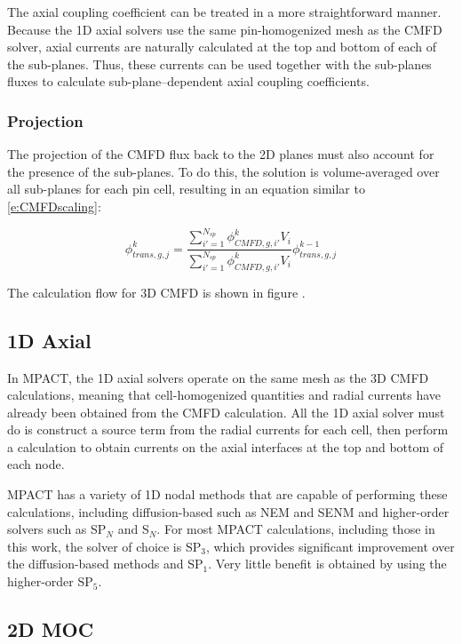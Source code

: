 The axial coupling coefficient can be treated in a more straightforward manner.  Because the 1D axial solvers use the same pin-homogenized mesh as the CMFD solver, axial currents are naturally calculated at the top and bottom of each of the sub-planes.  Thus, these currents can be used together with the sub-planes fluxes to calculate sub-plane--dependent axial coupling coefficients.

\subsubsection{Projection}

The projection of the CMFD flux back to the 2D planes must also account for the presence of the sub-planes.  To do this, the solution is volume-averaged over all sub-planes for each pin cell, resulting in an equation similar to \ref{e:CMFDscaling}:

\begin{equation}
\phi_{trans,g,j}^k = \frac{\sum_{i'=1}^{N_{sp}} \phi_{CMFD,g,i'}^k V_i}{\sum_{i'=1}^{N_{sp}} \phi_{CMFD,g,i'}^k V_i} \phi_{trans,g,j}^{k-1}
\end{equation}

The calculation flow for 3D CMFD is shown in figure .

\subsection{1D Axial}

In MPACT, the 1D axial solvers operate on the same mesh as the 3D CMFD calculations, meaning that cell-homogenized quantities and radial currents have already been obtained from the CMFD calculation.  All the 1D axial solver must do is construct a source term from the radial currents for each cell, then perform a calculation to obtain currents on the axial interfaces at the top and bottom of each node.

MPACT has a variety of 1D nodal methods that are capable of performing these calculations, including diffusion-based such as NEM and SENM and higher-order solvers such as SP$_N$ and S$_N$.  For most MPACT calculations, including those in this work, the solver of choice is SP$_3$, which provides significant improvement over the diffusion-based methods and SP$_1$.  Very little benefit is obtained by using the higher-order SP$_5$.

\subsection{2D MOC}


